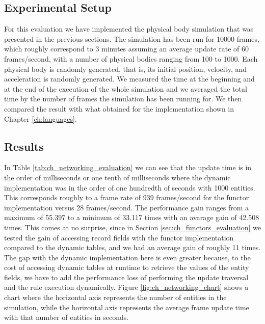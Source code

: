 \subsection{Experimental Setup}
For this evaluation we have implemented the physical body simulation that was presented in the previous sections. The simulation has been run for 10000 frames, which roughly correspond to 3 minutes assuming an average update rate of 60 frames/second, with a number of physical bodies ranging from 100 to 1000. Each physical body is randomly generated, that is, its initial position, velocity, and acceleration is randomly generated. We measured the time at the beginning and at the end of the execution of the whole simulation and we averaged the total time by the number of frames the simulation has been running for. We then compared the result with what obtained for the implementation shown in Chapter \ref{ch:languages}.

\subsection{Results}
In Table \ref{tab:ch_networking_evaluation} we can see that the update time is in the order of milliseconds or one tenth of milliseconds where the dynamic implementation was in the order of one hundredth of seconds with 1000 entities. This corresponds roughly to a frame rate of 939 frames/second for the functor implementation versus 28 frames/second. The performance gain ranges from a maximum of 55.397 to a minimum of 33.117 times with an avarage gain of 42.508 times. This comes at no surprise, since in Section \ref{sec:ch_functors_evaluation} we tested the gain of accessing record fields with the functor implementation compared to the dynamic tables, and we had an average gain of roughly 11 times. The gap with the dynamic implementation here is even greater because, to the cost of accessing dynamic tables at runtime to retrieve the values of the entity fields, we have to add the performance loss of performing the update traversal and the rule execution dynamically. Figure \ref{fig:ch_networking_chart} shows a chart where the horizontal axis represents the number of entities in the simulation, while the horizontal axis represents the average frame update time with that number of entities in seconds.


